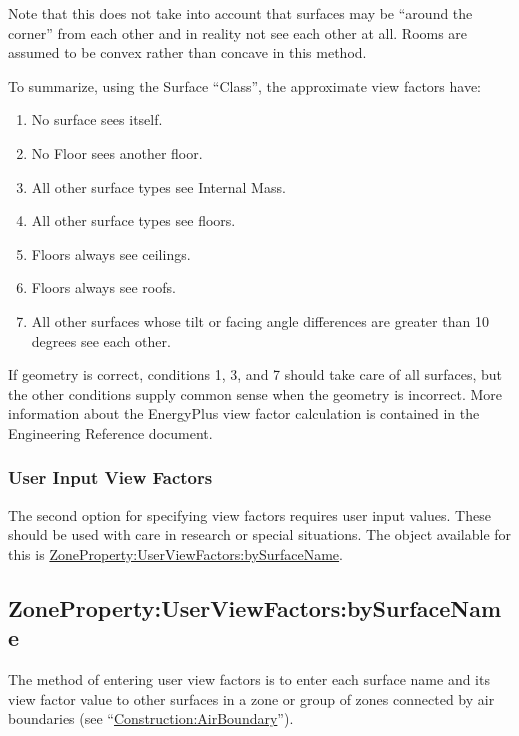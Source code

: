 Note that this does not take into account that surfaces may be ``around the corner'' from each other and in reality not see each other at all. Rooms are assumed to be convex rather than concave in this method.

To summarize, using the Surface ``Class'', the approximate view factors have:

\begin{enumerate}
  \item
    No surface sees itself.
  \item
    No Floor sees another floor.
  \item
    All other surface types see Internal Mass.
  \item
    All other surface types see floors.
  \item
    Floors always see ceilings.
  \item
    Floors always see roofs.
  \item
    All other surfaces whose tilt or facing angle differences are greater than 10 degrees see each other.
\end{enumerate}

If geometry is correct, conditions 1, 3, and 7 should take care of all surfaces, but the other conditions supply common sense when the geometry is incorrect. More information about the EnergyPlus view factor calculation is contained in the Engineering Reference document.

\subsubsection{User Input View Factors}\label{user-input-view-factors}

The second option for specifying view factors requires user input values. These should be used with care in research or special situations. The object available for this is \hyperref[zonepropertyuserviewfactorsbysurfacename]{ZoneProperty:UserViewFactors:bySurfaceName}.

\subsection{ZoneProperty:UserViewFactors:bySurfaceName}\label{zonepropertyuserviewfactorsbysurfacename}

The method of entering user view factors is to enter each surface name and its view factor value to other
surfaces in a zone or group of zones connected by air boundaries (see ``\hyperref[constructionairboundary]{Construction:AirBoundary}'').

